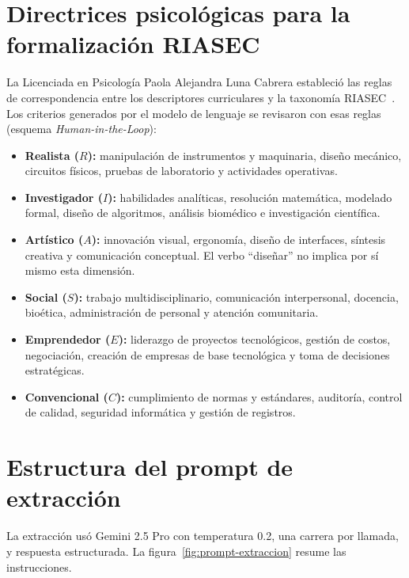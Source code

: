 \section{Directrices psicológicas para la formalización RIASEC}
La Licenciada en Psicología Paola Alejandra Luna Cabrera estableció las reglas de correspondencia entre los descriptores curriculares y la taxonomía RIASEC~\cite{Holland1997}. Los criterios generados por el modelo de lenguaje se revisaron con esas reglas (esquema \textit{Human-in-the-Loop}):
\begin{itemize}
    \item \textbf{Realista ($R$):} manipulación de instrumentos y maquinaria, diseño mecánico, circuitos físicos, pruebas de laboratorio y actividades operativas.
    \item \textbf{Investigador ($I$):} habilidades analíticas, resolución matemática, modelado formal, diseño de algoritmos, análisis biomédico e investigación científica.
    \item \textbf{Artístico ($A$):} innovación visual, ergonomía, diseño de interfaces, síntesis creativa y comunicación conceptual. El verbo ``diseñar'' no implica por sí mismo esta dimensión.
    \item \textbf{Social ($S$):} trabajo multidisciplinario, comunicación interpersonal, docencia, bioética, administración de personal y atención comunitaria.
    \item \textbf{Emprendedor ($E$):} liderazgo de proyectos tecnológicos, gestión de costos, negociación, creación de empresas de base tecnológica y toma de decisiones estratégicas.
    \item \textbf{Convencional ($C$):} cumplimiento de normas y estándares, auditoría, control de calidad, seguridad informática y gestión de registros.
\end{itemize}

\section{Estructura del prompt de extracción}
La extracción usó Gemini 2.5 Pro con temperatura 0.2, una carrera por llamada, y respuesta estructurada. La figura~\ref{fig:prompt-extraccion} resume las instrucciones.

